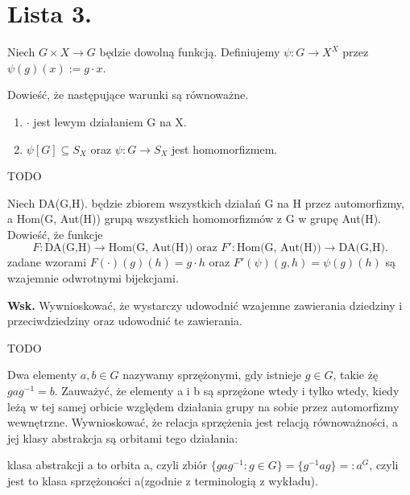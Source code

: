 \chapter{Lista 3.}	
\begin{problem}[1]

	Niech $G\times X\rightarrow G$ będzie dowolną funkcją. Definiujemy $\psi: G \rightarrow X^{X}$ przez $\psi(g)(x) := g\cdot x$.

	Dowieść, że następujące warunki są równoważne.
	\begin{enumerate}[label=\alph*)]
		\item $\cdot $ jest lewym działaniem G na X.
		\item $\psi[G] \subseteq S_{X}$ oraz $\psi: G\rightarrow S_{X}$ jest homomorfizmem.
	\end{enumerate}
\end{problem}
\begin{solution}

	TODO		
\end{solution}
\begin{problem}[2]

	Niech DA(G,H). będzie zbiorem wszystkich działań G na H przez automorfizmy, a Hom(G, Aut(H)) grupą wszystkich homomorfizmów z G w grupę Aut(H). Dowieść, że funkcje
	 \[
	F: \text{DA(G,H)}\rightarrow \text{Hom(G, Aut(H)) oraz } F': \text{Hom(G, Aut(H))} \rightarrow \text{DA(G,H)}
	.\] 
	zadane wzorami $F(\cdot )(g)(h) = g\cdot h$ oraz $F'(\psi)(g,h) = \psi(g)(h)$ są wzajemnie odwrotnymi bijekcjami.

	\textbf{Wsk.} Wywnioskować, że wystarczy udowodnić wzajemne zawierania dziedziny i przeciwdziedziny  oraz udowodnić te zawierania.
\end{problem}
\begin{solution}

	TODO	
\end{solution}
\begin{problem}[3]

	Dwa elementy $a,b \in G$ nazywamy sprzężonymi, gdy istnieje $g \in G$, takie żę $gag^{-1}=b$. Zauważyć, że elementy a i b są sprzężone wtedy i tylko wtedy, kiedy leżą w tej samej orbicie względem działania grupy na sobie przez automorfizmy wewnętrzne. Wywnioskować, że relacja sprzężenia jest relacją równoważności, a jej klasy abstrakcja są orbitami tego działania: 

	klasa abstrakcji a to orbita a, czyli zbiór $\{gag^{-1}: g\in G\} = \{g^{-1}ag\} =: a^{G}$, czyli jest to klasa sprzężoności a(zgodnie z terminologią z wykładu).
\end{problem}

